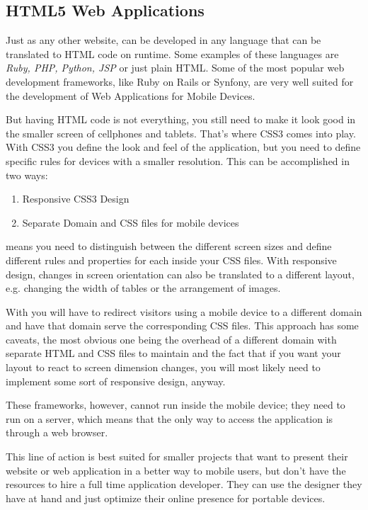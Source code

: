 \subsection{HTML5 Web Applications}\label{sec:web_app}
Just as any other website,  can be developed in any language that can be translated to HTML code on runtime. Some examples of these languages are \emph{Ruby, PHP, Python, JSP} or just plain HTML. Some of the most popular web development frameworks, like Ruby on Rails or Synfony, are very well suited for the development of Web Applications for Mobile Devices.


But having HTML code is not everything, you still need to make it look good in the smaller screen of cellphones and tablets. That's where CSS3 comes into play. With CSS3 you define the look and feel of the application, but you need to define specific rules for devices with a smaller resolution. This can be accomplished in two ways:
\begin{enumerate}
    \item Responsive CSS3 Design
    \item Separate Domain and CSS files for mobile devices
\end{enumerate}
 means you need to distinguish between the different screen sizes and define different rules and properties for each inside your CSS files. With responsive design, changes in screen orientation can also be translated to a different layout, e.g. changing the width of tables or the arrangement of images.


With  you will have to redirect visitors using a mobile device to a different domain and have that domain serve the corresponding CSS files. This approach has some caveats, the most obvious one being the overhead of a different domain with separate HTML and CSS files to maintain and the fact that if you want your layout to react to screen dimension changes, you will most likely need to implement some sort of responsive design, anyway.   
 

These frameworks, however, cannot run inside the mobile device; they need to run on a server, which means that the only way to access the application is through a web browser.


This line of action is best suited for smaller projects that want to present their website or web application in a better way to mobile users, but don't have the resources to hire a full time application developer. They can use the designer they have at hand and just optimize their online presence for portable devices.


